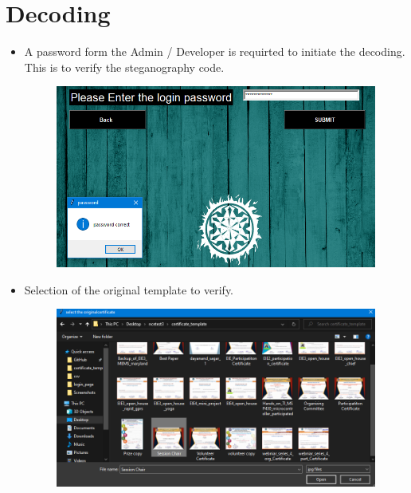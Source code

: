 \chapter{Decoding}

\begin{itemize}


	\item A password form the Admin / Developer is requirted to initiate the decoding. This is to verify the steganography code.

\begin{figure}[H]
	\centering
	\includegraphics[width=0.85\linewidth]{"images/generation_qr_nqr/Screenshot (76)"}
	\label{fig:screenshot-76}
\end{figure}

	\item Selection of the original template to verify.
	
\begin{figure}[H]
	\centering
	\includegraphics[width=0.85\linewidth]{"images/generation_qr_nqr/Screenshot (77)"}
	\label{fig:screenshot-77}
\end{figure}





\end{itemize}
